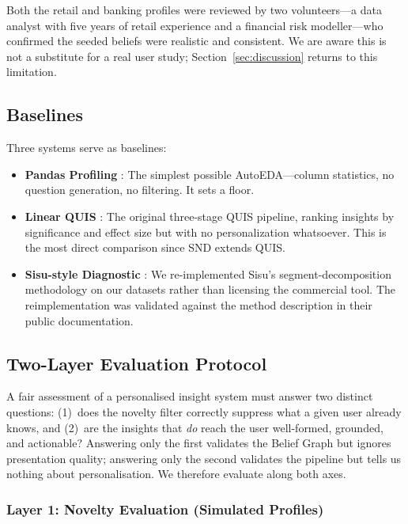 \documentclass[conference]{IEEEtran}
\begin{document}
Both the retail and banking profiles were reviewed by two volunteers---a
data analyst with five years of retail experience and a financial
risk modeller---who confirmed the seeded beliefs were realistic and
consistent. We are aware this is not a substitute for a real user
study; Section~\ref{sec:discussion} returns to this limitation.

\subsection{Baselines}

Three systems serve as baselines:

\begin{itemize}
  \item \textbf{Pandas Profiling} \cite{pandas_profiling}: The
  simplest possible AutoEDA---column statistics, no question
  generation, no filtering. It sets a floor.

  \item \textbf{Linear QUIS} \cite{quis2024emnlp}: The original
  three-stage QUIS pipeline, ranking insights by significance and
  effect size but with no personalization whatsoever. This is the
  most direct comparison since SND extends QUIS.

  \item \textbf{Sisu-style Diagnostic} \cite{sisu}: We re-implemented
  Sisu's segment-decomposition methodology on our datasets rather
  than licensing the commercial tool. The reimplementation was
  validated against the method description in their public
  documentation.
\end{itemize}

\subsection{Two-Layer Evaluation Protocol}

A fair assessment of a personalised insight system must answer two
distinct questions: (1)~does the novelty filter correctly suppress
what a given user already knows, and (2)~are the insights that
\emph{do} reach the user well-formed, grounded, and actionable?
Answering only the first validates the Belief Graph but ignores
presentation quality; answering only the second validates the
pipeline but tells us nothing about personalisation. We therefore
evaluate along both axes.

\subsubsection{Layer 1: Novelty Evaluation (Simulated Profiles)}
\end{document}
